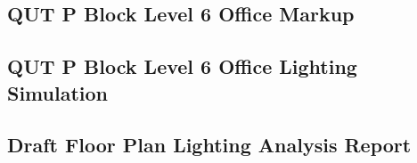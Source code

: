 \newpage
\subsection{QUT P Block Level 6 Office Markup}
\label{appendix:qut_lvl6_markup}



\subsection{QUT P Block Level 6 Office Lighting Simulation}
\label{appendix:QUT-Lvl6-office-rev3}



\subsection{Draft Floor Plan Lighting Analysis Report}
\label{appenddix:DraftFloorPlanLighting}




